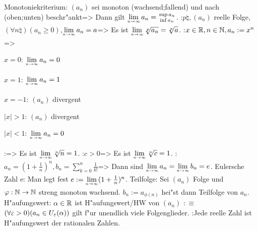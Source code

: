 \theorem Monotoniekriterium:
  $(a_n)$ sei monoton \tstack(wachsend;fallend) und nach \tstack(oben;unten) 
  beschr"ankt=>{
  Dann gilt $\limn a_n=\stack(\sup a_n;\inf a_n)$.
  }
\theorem:$p\natural,(a_n)$ reelle Folge,
  $(\forall n\natural)(a_n\ge0)$,$\limn a_n=a$=>{
  Es ist $\limn \root p\of{a_n}=\sqrt[p]a$.
  }
\theorem:$x\in\mathbb R,n\in\mathbb N,a_n:=x^n$=>{
  \begin{stmts}
    \item $x=0$: $\limn a_n=0$ 
    \item $x=1$: $\limn a_n=1$ 
    \item $x=-1$: $(a_n)$ divergent 
    \item $|x|>1$: $(a_n)$ divergent 
    \item $|x|<1$: $\limn a_n=0$ 
    \end{stmts}
  }
\theorem:=>{
  Es ist $\limn \sqrt[n]n=1$.
  }
\theorem:$c>0$=>{
  Es ist $\limn \sqrt[n]c=1$.
  }
\theorem:$a_n=(1+\frac 1 n)^n,b_n=\sum_{k=0}^n \frac 1{k!}$=>{
  Dann sind $\limn a_n=\limn b_n=e$.
  }
 Eulersche Zahl e:{
  Man legt fest $e:=\limn(1+\frac 1 n)^n$.
  }
 Teilfolge:{
  Sei $(a_n)$ Folge und $\varphi: \mathbb N\to\mathbb N$ streng monoton wachsend.
  $b_n:=a_{\phi(n)}$ hei"st dann Teilfolge von $a_n$.
}
 H"aufungswert:{
  $\alpha\in\mathbb R$ ist H"aufungswert/HW von $(a_n)$ $:\equiv$
  $(\forall \varepsilon>0)(a_n\in U_\varepsilon(\alpha))$ gilt f"ur unendlich viele Folgenglieder.
}
\remark:{Jede reelle Zahl ist H"aufungswert der rationalen Zahlen.}
